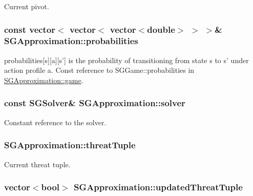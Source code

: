 Current pivot. \hypertarget{class_s_g_approximation_a82aefba3c77e331995e53b6692af4ada}{
\subsubsection[{probabilities}]{\setlength{\rightskip}{0pt plus 5cm}const vector$<$ vector$<$ vector$<$double$>$ $>$ $>$\& S\+G\+Approximation\+::probabilities\hspace{0.3cm}{\ttfamily [private]}}}\label{class_s_g_approximation_a82aefba3c77e331995e53b6692af4ada}
probabilities\mbox{[}s\mbox{]}\mbox{[}a\mbox{]}\mbox{[}s'\mbox{]} is the probability of transitioning from state s to s' under action profile a. Const reference to S\+G\+Game\+::probabilities in \hyperlink{class_s_g_approximation_a3244a3d7de5f2b909d438f5b4ab337ee}{S\+G\+Approximation\+::game}. \hypertarget{class_s_g_approximation_a0f3be9758c5ee97b4fafd7d15e9f3c88}{
\subsubsection[{solver}]{\setlength{\rightskip}{0pt plus 5cm}const {\bf S\+G\+Solver}\& S\+G\+Approximation\+::solver\hspace{0.3cm}{\ttfamily [private]}}}\label{class_s_g_approximation_a0f3be9758c5ee97b4fafd7d15e9f3c88}
Constant reference to the solver. \hypertarget{class_s_g_approximation_aee3bab15aee351f8a543df2799f2c9f6}{
\subsubsection[{threat\+Tuple}]{ S\+G\+Approximation\+::threat\+Tuple\hspace{0.3cm}{\ttfamily [private]}}}\label{class_s_g_approximation_aee3bab15aee351f8a543df2799f2c9f6}
Current threat tuple. \hypertarget{class_s_g_approximation_afb83095fff0f02df719ed3654abab5a8}{
\subsubsection[{updated\+Threat\+Tuple}]{\setlength{\rightskip}{0pt plus 5cm}vector$<$bool$>$ S\+G\+Approximation\+::updated\+Threat\+Tuple\hspace{0.3cm}{\ttfamily [private]}}}\label{class_s_g_approximation_afb83095fff0f02df719ed3654abab5a8}
